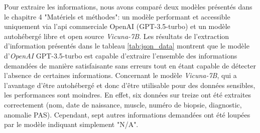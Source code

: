 Pour extraire les informations, nous avons comparé deux modèles présentés dans le chapitre 4 "Matériels et méthodes": un modèle performant et accessible uniquement via l'\gls{api} commerciale OpenAI (GPT-3.5-turbo) et un modèle autohébergé libre et open source \textit{Vicuna-7B}. Les résultats de l'extraction d'information présentés dans le tableau \ref{tab:json_data} montrent que le modèle d'\textit{OpenAI} GPT-3.5-turbo est capable d'extraire l'ensemble des informations demandées de manière satisfaisante sans erreurs tout en étant capable de détecter l'absence de certaines informations. Concernant le modèle \textit{Vicuna-7B}, qui a l'avantage d'être autohébergé et donc d'être utilisable pour des données sensibles, les performances sont moindres. En effet, six données sur treize ont été extraites correctement (nom, date de naissance, muscle, numéro de biopsie, diagnostic, anomalie PAS). Cependant, sept autres informations demandées ont été loupées par le modèle indiquant simplement "N/A".

